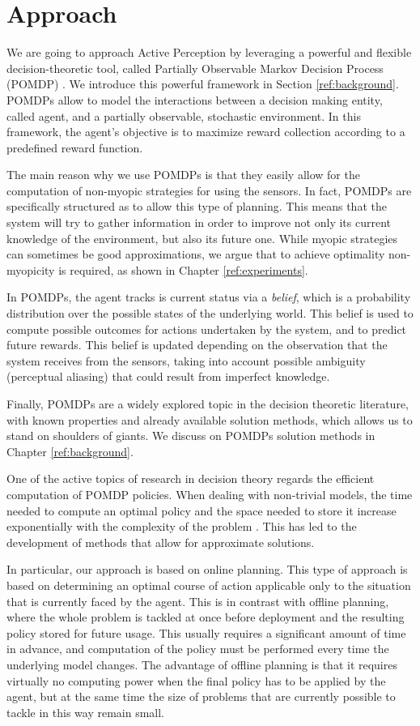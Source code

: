 \section{Approach}

We are going to approach Active Perception by leveraging a powerful and flexible decision-theoretic
tool, called Partially Observable Markov Decision Process (POMDP) \cite{cit:pomdp}. We introduce
this powerful framework in Section \ref{ref:background}. POMDPs allow to model the interactions
between a decision making entity, called agent, and a partially observable, stochastic environment.
In this framework, the agent's objective is to maximize reward collection according to a predefined
reward function.

The main reason why we use POMDPs is that they easily allow for the computation of non-myopic
strategies for using the sensors. In fact, POMDPs are specifically structured as to allow this type
of planning. This means that the system will try to gather information in order to improve not only
its current knowledge of the environment, but also its future one. While myopic strategies can
sometimes be good approximations, we argue that to achieve optimality non-myopicity is required, as
shown in Chapter \ref{ref:experiments}.

In POMDPs, the agent tracks is current status via a \textit{belief}, which is a probability
distribution over the possible states of the underlying world. This belief is used to compute
possible outcomes for actions undertaken by the system, and to predict future rewards. This belief
is updated depending on the observation that the system receives from the sensors, taking into
account possible ambiguity (perceptual aliasing) that could result from imperfect knowledge.

Finally, POMDPs are a widely explored topic in the decision theoretic literature, with known
properties and already available solution methods, which allows us to stand on shoulders of giants.
We discuss on POMDPs solution methods in Chapter \ref{ref:background}.

One of the active topics of research in decision theory regards the efficient computation of POMDP
policies. When dealing with non-trivial models, the time needed to compute an optimal policy and the
space needed to store it increase exponentially with the complexity of the problem \cite{cit:pomdp}.
This has led to the development of methods that allow for approximate solutions.

In particular, our approach is based on online planning. This type of approach is based on
determining an optimal course of action applicable only to the situation that is currently faced by
the agent. This is in contrast with offline planning, where the whole problem is tackled at once
before deployment and the resulting policy stored for future usage. This usually requires a
significant amount of time in advance, and computation of the policy must be performed every time
the underlying model changes. The advantage of offline planning is that it requires virtually no
computing power when the final policy has to be applied by the agent, but at the same time the size
of problems that are currently possible to tackle in this way remain small.


